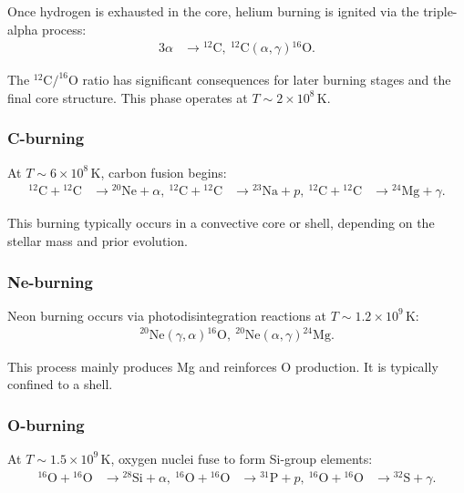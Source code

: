 Once hydrogen is exhausted in the core, helium burning is ignited via the triple-alpha process:
\begin{align}
3\alpha &\rightarrow {}^{12}\mathrm{C}, \
{}^{12}\mathrm{C}(\alpha,\gamma){}^{16}\mathrm{O}.
\end{align}

The $^{12}\mathrm{C}/^{16}\mathrm{O}$ ratio has significant consequences for later burning stages and the final core structure. This phase operates at $T \sim 2\times10^8\,\mathrm{K}$.

\subsubsection{C-burning}

At $T \sim 6\times10^8\,\mathrm{K}$, carbon fusion begins:
\begin{align}
{}^{12}\mathrm{C} + {}^{12}\mathrm{C} &\rightarrow {}^{20}\mathrm{Ne} + \alpha, \
{}^{12}\mathrm{C} + {}^{12}\mathrm{C} &\rightarrow {}^{23}\mathrm{Na} + p, \
{}^{12}\mathrm{C} + {}^{12}\mathrm{C} &\rightarrow {}^{24}\mathrm{Mg} + \gamma.
\end{align}

This burning typically occurs in a convective core or shell, depending on the stellar mass and prior evolution.

\subsubsection{Ne-burning}

Neon burning occurs via photodisintegration reactions at $T \sim 1.2\times10^9\,\mathrm{K}$:
\begin{align}
{}^{20}\mathrm{Ne}(\gamma,\alpha){}^{16}\mathrm{O}, \
{}^{20}\mathrm{Ne}(\alpha,\gamma){}^{24}\mathrm{Mg}.
\end{align}

This process mainly produces Mg and reinforces O production. It is typically confined to a shell.

\subsubsection{O-burning}

At $T \sim 1.5\times10^9\,\mathrm{K}$, oxygen nuclei fuse to form Si-group elements:
\begin{align}
{}^{16}\mathrm{O} + {}^{16}\mathrm{O} &\rightarrow {}^{28}\mathrm{Si} + \alpha, \
{}^{16}\mathrm{O} + {}^{16}\mathrm{O} &\rightarrow {}^{31}\mathrm{P} + p, \
{}^{16}\mathrm{O} + {}^{16}\mathrm{O} &\rightarrow {}^{32}\mathrm{S} + \gamma.
\end{align}

